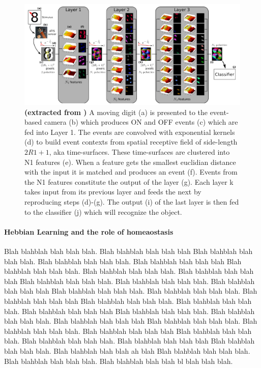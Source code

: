 \documentclass[12pt]{article}
\begin{document}
\begin{figure}[!ht]%
\includegraphics[width=.99\linewidth]{../notebooks/fig/hots.png}
\caption
{
\textbf{(extracted from \cite{lagorce2016hots}) } A moving digit (a) is presented to the event-based camera (b) which produces ON and OFF events (c) which are fed into Layer 1. The events are convolved with exponential kernels (d) to build event contexts from spatial receptive field of side-length $2R1+1$, aka time-surfaces. These time-surfaces are clustered into N1 features (e). When a feature gets the smallest euclidian distance with the input it is matched and produces an event (f). Events from the N1 features constitute the output of the layer (g). Each layer k takes input from its previous layer and feeds the next by reproducing steps (d)-(g). The output (i) of the last layer is then fed to the classifier (j) which will recognize the object.
\label{fig:fig1}
}
\end{figure}

\paragraph*{Hebbian Learning and the role of homeaostasis}
Blah blahblah blah blah blah. Blah blahblah blah blah blah Blah blahblah blah blah blah.
Blah blahblah blah blah blah. Blah blahblah blah blah blah Blah blahblah blah blah blah.
Blah blahblah blah blah blah. Blah blahblah blah blah blah Blah blahblah blah blah blah.
Blah blahblah blah blah blah. Blah blahblah blah blah blah Blah blahblah blah blah blah.
Blah blahblah blah blah blah. Blah blahblah blah blah blah Blah blahblah blah blah blah.
Blah blahblah blah blah blah. Blah blahblah blah blah blah Blah blahblah blah blah blah.
Blah blahblah blah blah blah. Blah blahblah blah blah blah Blah blahblah blah blah blah.
Blah blahblah blah blah blah. Blah blahblah blah blah blah Blah blahblah blah blah blah.
Blah blahblah blah blah blah. Blah blahblah blah blah blah Blah blahblah blah blah blah.
Blah blahblah blah blah ah blah Blah blahblah blah blah blah.
Blah blahblah blah blah blah. Blah blahblah blah blah bl blah blah blah.
%
\end{document}
